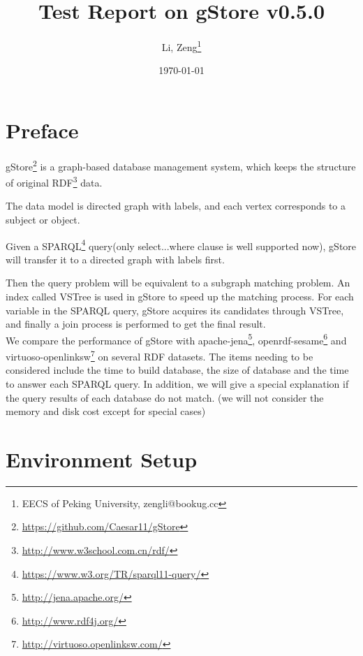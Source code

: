 \documentclass[titlepage, a4paper, 12pt] {article}
\begin{document}
\title{\textbf{Test Report on gStore v0.5.0}}
\author{Li, Zeng\footnote{EECS of Peking University, zengli@bookug.cc}}
\date{\today}
\maketitle

\setcounter{tocdepth}{3}
\tableofcontents
\clearpage

\section{Preface}

gStore\footnote{\href{https://github.com/Caesar11/gStore}{https://github.com/Caesar11/gStore}} is a graph-based database management system, which keeps the structure of original RDF\footnote{\href{http://www.w3school.com.cn/rdf/}{http://www.w3school.com.cn/rdf/}} data. 

The data model is directed graph with labels, and each vertex corresponds to a subject or object. 

Given a SPARQL\footnote{\href{https://www.w3.org/TR/sparql11-query/}{https://www.w3.org/TR/sparql11-query/}} query(only select...where clause is well supported now), gStore will transfer it to a directed graph with labels first.

Then the query problem will be equivalent to a subgraph matching problem.
An index called VSTree is used in gStore to speed up the matching process. For each variable in the SPARQL query, gStore acquires its candidates through VSTree, and finally a join process is performed to get the final result.  \\

We compare the performance of gStore with apache-jena\footnote{\href{http://jena.apache.org/}{http://jena.apache.org/}}, openrdf-sesame\footnote{\href{http://www.rdf4j.org/}{http://www.rdf4j.org/}} and virtuoso-openlinksw\footnote{\href{http://virtuoso.openlinksw.com/}{http://virtuoso.openlinksw.com/}} on several RDF datasets.
The items needing to be considered include the time to build database, the size of database and the time to answer each SPARQL query.
In addition, we will give a special explanation if the query results of each database do not match.
(we will not consider the memory and disk cost except for special cases) \\

\clearpage

\section{Environment Setup}
\end{document}
